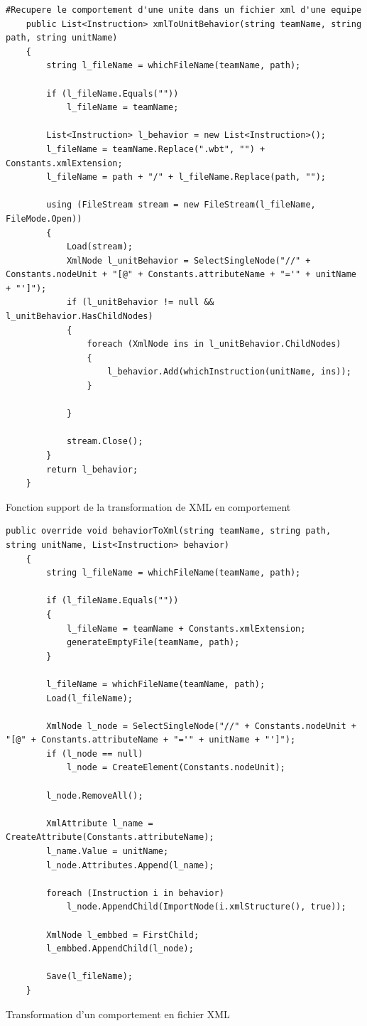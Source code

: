 \documentclass{report}
\begin{document}
\begin{lstlisting}[frame=single]
  #Recupere le comportement d'une unite dans un fichier xml d'une equipe
    public List<Instruction> xmlToUnitBehavior(string teamName, string path, string unitName)
    {
        string l_fileName = whichFileName(teamName, path);

        if (l_fileName.Equals(""))
            l_fileName = teamName;

        List<Instruction> l_behavior = new List<Instruction>();
        l_fileName = teamName.Replace(".wbt", "") + Constants.xmlExtension;
        l_fileName = path + "/" + l_fileName.Replace(path, "");

        using (FileStream stream = new FileStream(l_fileName, FileMode.Open))
        {
            Load(stream);
            XmlNode l_unitBehavior = SelectSingleNode("//" + Constants.nodeUnit + "[@" + Constants.attributeName + "='" + unitName + "']");
            if (l_unitBehavior != null && l_unitBehavior.HasChildNodes)
            {
                foreach (XmlNode ins in l_unitBehavior.ChildNodes)
                {
                    l_behavior.Add(whichInstruction(unitName, ins));
                }

            }

            stream.Close();
        }
        return l_behavior;
    }
\end{lstlisting}
 {Fonction support de la transformation de XML en comportement}

\begin{lstlisting}[frame=single]
  public override void behaviorToXml(string teamName, string path, string unitName, List<Instruction> behavior)
    {
        string l_fileName = whichFileName(teamName, path);

        if (l_fileName.Equals(""))
        {
            l_fileName = teamName + Constants.xmlExtension;
            generateEmptyFile(teamName, path);
        }

        l_fileName = whichFileName(teamName, path);
        Load(l_fileName);

        XmlNode l_node = SelectSingleNode("//" + Constants.nodeUnit + "[@" + Constants.attributeName + "='" + unitName + "']");
        if (l_node == null)
            l_node = CreateElement(Constants.nodeUnit);

        l_node.RemoveAll();

        XmlAttribute l_name = CreateAttribute(Constants.attributeName);
        l_name.Value = unitName;
        l_node.Attributes.Append(l_name);

        foreach (Instruction i in behavior)
            l_node.AppendChild(ImportNode(i.xmlStructure(), true));

        XmlNode l_embbed = FirstChild;
        l_embbed.AppendChild(l_node);

        Save(l_fileName);
    }
\end{lstlisting}
 {Transformation d’un comportement en fichier XML}
\end{document}
